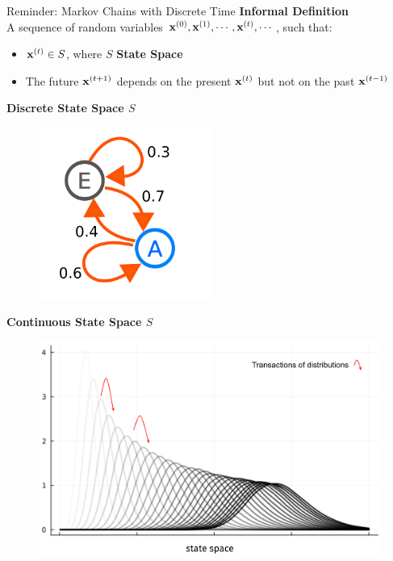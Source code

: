 \documentclass[aspectratio=169, 10pt]{beamer}
\theoremstyle{definition}
\begin{document}
\begin{frame}{Reminder: Markov Chains with Discrete Time}
\textbf{Informal Definition}\\ 
A sequence of random variables ${\mathbf{x}}^{(0)},{\mathbf{x}}^{(1)},\cdots,{\mathbf{x}}^{(t)},\cdots$,
such that:
\begin{itemize}
  \item ${\mathbf{x}}^{(t)}\in S$, where $S$ \textbf{State Space}
  \item The future ${\mathbf{x}}^{(t+1)}$ depends on the present ${\mathbf{x}}^{(t)}$ 
    but not on the past ${\mathbf{x}}^{(t-1)}$
\end{itemize}
  \vfill
  \begin{minipage}[t]{0.5\textwidth}
    \begin{center}
      \textbf{Discrete State Space $S$}
    \end{center}
    \begin{figure}[h!]
      \centering
      \includegraphics[width=0.5\textwidth, trim=0 0 0
      3cm]{./pic/markov_chain_discrete space.png}\
    \end{figure}
  \end{minipage}\hfill%
  \begin{minipage}[t]{0.5\textwidth}
    \begin{center}
      \textbf{Continuous State Space $S$}
    \end{center}
    \begin{figure}[h!]
      \centering
      \includegraphics[width=\textwidth, trim=0 0 0
      4cm]{./pic/markov_chain_continous space2.png}
    \end{figure}
  \end{minipage}
\end{frame}
\end{document}
